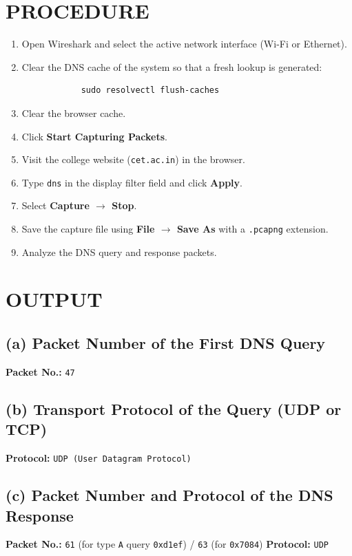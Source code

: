\documentclass[12pt,a4paper]{article}
\begin{document}
	\section*{PROCEDURE}
	\begin{enumerate}
		\item Open Wireshark and select the active network interface (Wi-Fi or Ethernet).
		\item Clear the DNS cache of the system so that a fresh lookup is generated:
		\begin{lstlisting}
			sudo resolvectl flush-caches
		\end{lstlisting}
		\item Clear the browser cache.
		\item Click \textbf{Start Capturing Packets}.
		\item Visit the college website (\texttt{cet.ac.in}) in the browser.
		\item Type \texttt{dns} in the display filter field and click \textbf{Apply}.
		\item Select \textbf{Capture $\rightarrow$ Stop}.
		\item Save the capture file using \textbf{File $\rightarrow$ Save As} with a \texttt{.pcapng} extension.
		\item Analyze the DNS query and response packets.
	\end{enumerate}
	
	\section*{OUTPUT}
	
	\subsection*{(a) Packet Number of the First DNS Query}
	\textbf{Packet No.:} \texttt{47} 
	
	\subsection*{(b) Transport Protocol of the Query (UDP or TCP)}
	\textbf{Protocol:} \texttt{UDP (User Datagram Protocol)}
	
	\subsection*{(c) Packet Number and Protocol of the DNS Response}
	\textbf{Packet No.:} \texttt{61} (for type \texttt{A} query \texttt{0xd1ef}) / \texttt{63} (for \texttt{0x7084}) \hfill \textbf{Protocol:} \texttt{UDP}
	
\end{document}
